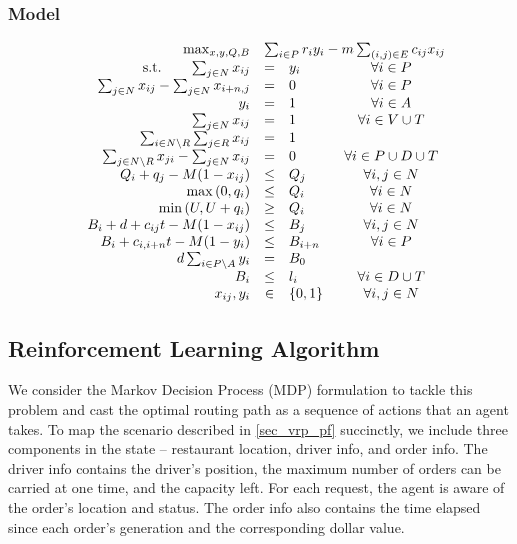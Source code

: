 \documentclass{article}
\begin{document}
\subsubsection*{Model}
\begin{equation}
\begin{array}{rrclcl}
& \max_{x, y, Q, B} & \multicolumn{3}{l}{ \sum_{i \in P} r_i y_i - m \sum_{(i,j) \in E} c_{ij} x_{ij}  } \\  
& \textrm{s.t.} \qquad  \sum_{j \in N} x_{ij}   &=& y_i & \forall i \in P \\   %
& \sum_{j \in N} x_{ij} - \sum_{j \in N} x_{i+n,j}  & = & 0 & \forall i \in P  \\     %
& y_i & =& 1 & \forall i \in A \\  %
& \sum_{j \in N} x_{ij}   &=& 1 & \forall i \in V \cup T \\  %
& \sum_{i \in N \setminus R } \sum_{j \in R }  x_{ij}   &=& 1  &\\     %
& \sum_{j \in N \setminus R } x_{ji} - \sum_{j \in N} x_{ij}  & = & 0 & \forall i \in P \cup D \cup T  \\     %
& Q_i + q_j - M (1-x_{ij} ) &\leq& Q_j & \forall i,j \in N \\  %
& \max{(0, q_i)}    &\leq& Q_i & \forall i \in N \\  %
& \min{(U, U+q_i)}    &\geq& Q_i & \forall i \in N \\  %
& B_i + d + c_{ij} t -  M (1-x_{ij} )  &\leq& B_j   & \forall i,j \in N \\  %
& B_i +  c_{i, i+n} t -  M (1- y_i )  &\leq& B_{i+n}  & \forall i \in P \\ %
&  d \sum_{i \in P \setminus A}  y_i  & = & B_0  \\ %
& B_i  &\leq& l_i  & \forall i \in D \cup T \\ %
& x_{ij}, y_i &\in& \{0, 1\} & \forall i,j \in N  \\ 
\end{array}
\end{equation}


\subsection{Reinforcement Learning Algorithm}
We consider the Markov Decision Process (MDP) formulation to tackle this problem and cast the optimal routing path as a sequence of actions that an agent takes. To map the scenario described in \ref{sec_vrp_pf} succinctly, we include three components in the state -- restaurant location, driver info, and order info. The driver info contains the driver's position, the maximum number of orders can be carried at one time, and the capacity left. For each request, the agent is aware of the order's location and status. The order info also contains the time elapsed since each order's generation and the corresponding dollar value. 
\end{document}
